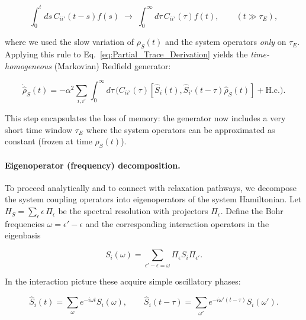 \begin{equation}
	\int_0^t ds\, C_{ii'}(t-s) f(s) \; \longrightarrow \; \int_0^{\infty} d\tau\, C_{ii'}(\tau) f(t), \qquad (t \gg \tau_E),
	\label{eq:Markov_extension_rule}
\end{equation}

\noindent
where we used the slow variation of $\rho_S(t)$ and the system operators \textit{only} on $\tau_E$. 
Applying this rule to Eq.~\eqref{eq:Partial_Trace_Derivation} yields the \emph{time-homogeneous} (Markovian) Redfield generator:

\begin{equation}
	\boxed{
		\dot{\hat{\rho}}_S(t) = - \alpha^2 \sum_{i,i'} \int_0^{\infty} d\tau \, \Big( C_{ii'}(\tau) [\hat{S}_i(t), \hat{S}_{i'}(t-\tau) \hat{\rho}_S(t)] + \text{H.c.}\Big).
	}
	\label{eq:Redfield_Markov_TimeLocal}
\end{equation}

\noindent
This step encapsulates the loss of memory: the generator now includes a very short time window $\tau_E$ where the system operators can be approximated as constant (frozen at time $\rho_S(t)$).


\paragraph{Eigenoperator (frequency) decomposition.}

\noindent
To proceed analytically and to connect with relaxation pathways, we decompose the system coupling operators into eigenoperators of the system Hamiltonian. Let $H_S = \sum_{\epsilon} \epsilon \, \Pi_{\epsilon}$ be the spectral resolution with projectors $\Pi_{\epsilon}$. Define the Bohr frequencies $\omega = \epsilon' - \epsilon$ and the corresponding interaction operators in the eigenbasis

\begin{equation}
	S_i(\omega) = \sum_{\epsilon' - \epsilon = \omega} \Pi_{\epsilon} S_i \Pi_{\epsilon'}.
	\label{eq:Eigenoperator_Decomposition}
\end{equation}

\noindent
In the interaction picture these acquire simple oscillatory phases:

\begin{equation}
	\hat{S}_i(t) = \sum_{\omega} e^{-i \omega t} S_i(\omega), \qquad \hat{S}_i(t-\tau) = \sum_{\omega'} e^{-i \omega'(t-\tau)} S_i(\omega').
	\label{eq:Interaction_Picture_Eigenoperators}
\end{equation}

